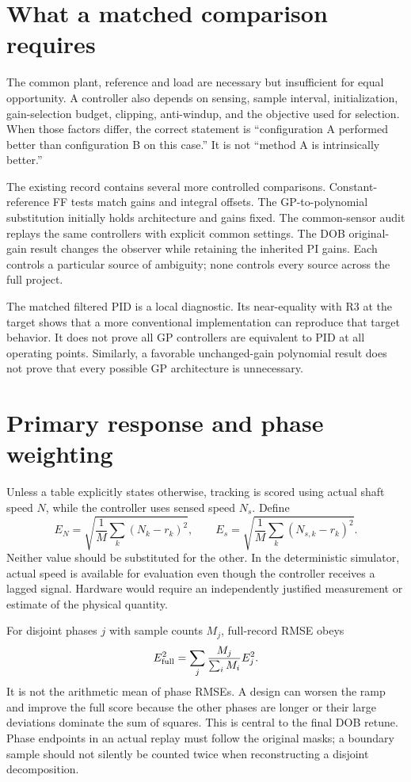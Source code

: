 \section{What a matched comparison requires}
The common plant, reference and load are necessary but insufficient for equal opportunity. A controller also depends on sensing, sample interval, initialization, gain-selection budget, clipping, anti-windup, and the objective used for selection. When those factors differ, the correct statement is ``configuration A performed better than configuration B on this case.'' It is not ``method A is intrinsically better.''

The existing record contains several more controlled comparisons. Constant-reference FF tests match gains and integral offsets. The GP-to-polynomial substitution initially holds architecture and gains fixed. The common-sensor audit replays the same controllers with explicit common settings. The DOB original-gain result changes the observer while retaining the inherited PI gains. Each controls a particular source of ambiguity; none controls every source across the full project.

The matched filtered PID is a local diagnostic. Its near-equality with R3 at the target shows that a more conventional implementation can reproduce that target behavior. It does not prove all GP controllers are equivalent to PID at all operating points. Similarly, a favorable unchanged-gain polynomial result does not prove that every possible GP architecture is unnecessary.

\section{Primary response and phase weighting}
Unless a table explicitly states otherwise, tracking is scored using actual shaft speed $N$, while the controller uses sensed speed $N_s$. Define
\begin{equation}
E_N=\sqrt{\frac{1}{M}\sum_k(N_k-r_k)^2},\qquad
E_s=\sqrt{\frac{1}{M}\sum_k(N_{s,k}-r_k)^2}.
\end{equation}
Neither value should be substituted for the other. In the deterministic simulator, actual speed is available for evaluation even though the controller receives a lagged signal. Hardware would require an independently justified measurement or estimate of the physical quantity.

For disjoint phases $j$ with sample counts $M_j$, full-record RMSE obeys
\begin{equation}
E_{\rm full}^2=\sum_j\frac{M_j}{\sum_iM_i}E_j^2.
\end{equation}
It is not the arithmetic mean of phase RMSEs. A design can worsen the ramp and improve the full score because the other phases are longer or their large deviations dominate the sum of squares. This is central to the final DOB retune. Phase endpoints in an actual replay must follow the original masks; a boundary sample should not silently be counted twice when reconstructing a disjoint decomposition.

